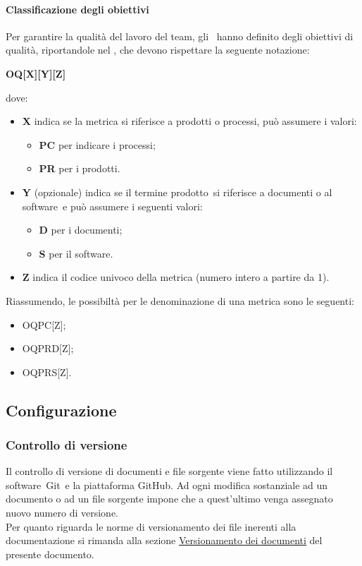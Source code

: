 \documentclass[../NormeProgetto.text]{subfiles}
\begin{document}
		\paragraph{Classificazione degli obiettivi}
			Per garantire la qualità del lavoro del team\g, gli \amministratori\ hanno definito degli obiettivi di qualità, riportandole nel \pianodiqualifica , che devono rispettare la seguente notazione: \begin{center}\textbf{OQ[X][Y][Z]}\end{center} dove:
			\begin{itemize}
				\item \textbf{X} indica se la metrica si riferisce a prodotti o processi, può assumere i valori:
				\begin{itemize}
					\item \textbf{PC} per indicare i processi;
					\item \textbf{PR} per i prodotti.
				\end{itemize}
				\item \textbf{Y} (opzionale) indica se il termine prodotto\g\ si riferisce a documenti o al software\g\ e può assumere i seguenti valori:
					\begin{itemize}
						\item \textbf{D} per i documenti;
						\item \textbf{S} per il software\g.
					\end{itemize}
				\item \textbf{Z} indica il codice univoco della metrica (numero intero a partire da 1).
			\end{itemize}
			Riassumendo, le possibiltà per le denominazione di una metrica sono le seguenti:
			\begin{itemize}
				\item OQPC[Z];
				\item OQPRD[Z];
				\item OQPRS[Z].
			\end{itemize}
\subsection{Configurazione}
	\subsubsection{Controllo di versione}
		Il controllo di versione di documenti e file sorgente viene fatto utilizzando il software\g\ Git\g\ e la piattaforma GitHub\g. Ad ogni modifica sostanziale ad un documento o ad un file sorgente impone che a quest'ultimo venga assegnato nuovo numero di versione. \\ Per quanto riguarda le norme di versionamento dei file inerenti alla documentazione si rimanda alla sezione \hyperref[sec:Versionamento dei documenti]{Versionamento dei documenti} del presente documento.
\end{document}
